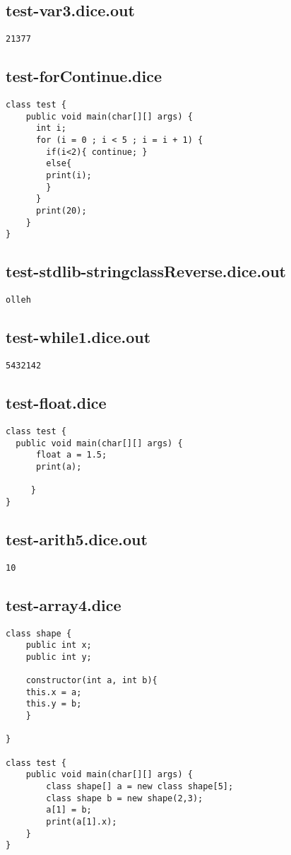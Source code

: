 \subsection{test-var3.dice.out}
\begin{verbatim}
21377
\end{verbatim}
\pagebreak
\subsection{test-forContinue.dice}
\begin{verbatim}
class test {
	public void main(char[][] args) {
	  int i;
	  for (i = 0 ; i < 5 ; i = i + 1) {
	  	if(i<2){ continue; }
	  	else{
	    print(i);
	    }
	  }
	  print(20);
	}
}

\end{verbatim}
\pagebreak
\subsection{test-stdlib-stringclassReverse.dice.out}
\begin{verbatim}
olleh
\end{verbatim}
\pagebreak
\subsection{test-while1.dice.out}
\begin{verbatim}
5432142
\end{verbatim}
\pagebreak
\subsection{test-float.dice}
\begin{verbatim}
class test {
  public void main(char[][] args) {
      float a = 1.5;
      print(a);

     }
}
\end{verbatim}
\pagebreak
\subsection{test-arith5.dice.out}
\begin{verbatim}
10
\end{verbatim}
\pagebreak
\subsection{test-array4.dice}
\begin{verbatim}
class shape {
	public int x;
	public int y;

	constructor(int a, int b){
	this.x = a;
	this.y = b;
	}

}

class test {
	public void main(char[][] args) {
		class shape[] a = new class shape[5];
		class shape b = new shape(2,3);
		a[1] = b;
		print(a[1].x);
	}
}

\end{verbatim}
\pagebreak
